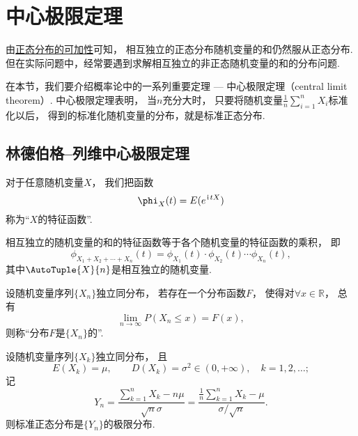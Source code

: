 \section{中心极限定理}
由\hyperref[theorem:正态分布与自然指数分布族.正态分布的可加性2]{正态分布的可加性}可知，
相互独立的正态分布随机变量的和仍然服从正态分布.
但在实际问题中，经常要遇到求解相互独立的非正态随机变量的和的分布问题.

在本节，我们要介绍概率论中的一系列重要定理 --- 中心极限定理（central limit theorem）.
中心极限定理表明，
当\(n\)充分大时，
只要将随机变量\(\frac1n \sum_{i=1}^n X_i\)标准化以后，
得到的标准化随机变量的分布，就是标准正态分布.

\subsection{林德伯格--列维中心极限定理}
\begin{definition}
对于任意随机变量\(X\)，
我们把函数\[
	\phi_X(t) = E(e^{\iu t X})
\]
称为“\(X\)的特征函数”.
\end{definition}

\begin{lemma}
相互独立的随机变量的和的特征函数等于各个随机变量的特征函数的乘积，
即\[
	\phi_{X_1+X_2+\dotsb+X_n}(t)
	= \phi_{X_1}(t)
	\cdot \phi_{X_2}(t)
	\dotsb
	\phi_{X_n}(t),
\]
其中\(\AutoTuple{X}{n}\)是相互独立的随机变量.
\end{lemma}

\begin{definition}
设随机变量序列\(\{X_n\}\)独立同分布，
若存在一个分布函数\(F\)，
使得对\(\forall x\in\mathbb{R}\)，
总有\[
	\lim_{n\to\infty} P(X_n \leq x) = F(x),
\]
则称“分布\(F\)是\(\{X_n\}\)的”.
\end{definition}

\begin{theorem}\label{theorem:极限定理.林德伯格--列维中心极限定理}
设随机变量序列\(\{X_k\}\)独立同分布，
且\[
	E(X_k)=\mu, \qquad
	D(X_k)=\sigma^2\in(0,+\infty),
	\quad k=1,2,\dotsc;
\]
记\[
	Y_n = \frac{\sum_{k=1}^n X_k - n\mu}{\sqrt{n} \sigma}
	= \frac{ \frac1n \sum_{k=1}^n X_k - \mu}{\sigma / \sqrt{n}}.
\]
则标准正态分布是\(\{Y_n\}\)的极限分布.
\end{theorem}

